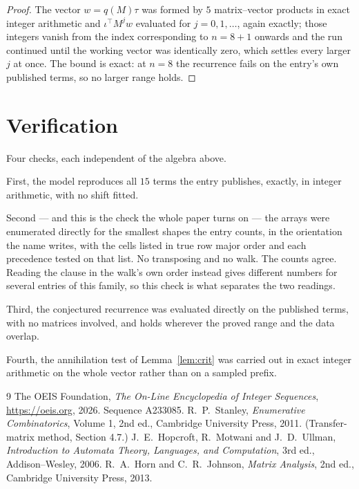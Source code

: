 \documentclass[11pt,a4paper]{article}
\theoremstyle{plain}
\theoremstyle{definition}
\begin{document}
\begin{proof}
The vector $w=q(M)\tau$ was formed by $5$ matrix--vector products in exact integer
arithmetic and $\iota^{\!\top}M^{j}w$ evaluated for $j=0,1,\dots$, again exactly; those
integers vanish from the index corresponding to $n=8+1$ onwards and the run continued
until the working vector was identically zero, which settles every larger $j$ at once. The bound is exact: at $n=8$ the recurrence fails on the entry's own published terms, so no larger range holds.
\end{proof}

\section{Verification}

Four checks, each independent of the algebra above.

First, the model reproduces all $15$ terms the entry publishes, exactly, in integer
arithmetic, with no shift fitted.

Second --- and this is the check the whole paper turns on --- the arrays were enumerated
directly for the smallest shapes the entry counts, in the orientation the name writes, with the
cells listed in true row major order and each precedence tested on that list. No transposing
and no walk. The counts agree. Reading the clause in the walk's own order instead gives
different numbers for several entries of this family, so this check is what separates the two
readings.

Third, the conjectured recurrence was evaluated directly on the published terms, with no
matrices involved, and holds wherever the proved range and the data overlap.

Fourth, the annihilation test of Lemma~\ref{lem:crit} was carried out in exact integer
arithmetic on the whole vector rather than on a sampled prefix.

\begin{thebibliography}{9}
 The OEIS Foundation, \emph{The On-Line Encyclopedia of Integer
Sequences}, \url{https://oeis.org}, 2026. Sequence A233085.
 R.~P.~Stanley, \emph{Enumerative Combinatorics}, Volume 1, 2nd ed.,
Cambridge University Press, 2011. (Transfer-matrix method, Section 4.7.)
 J.~E.~Hopcroft, R.~Motwani and J.~D.~Ullman, \emph{Introduction to
Automata Theory, Languages, and Computation}, 3rd ed., Addison--Wesley, 2006.
 R.~A.~Horn and C.~R.~Johnson, \emph{Matrix Analysis}, 2nd ed., Cambridge
University Press, 2013.
\end{thebibliography}
\end{document}
